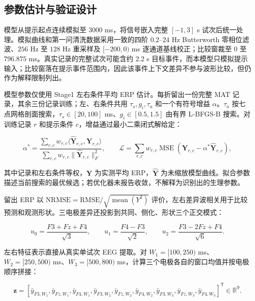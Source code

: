 \subsection{参数估计与验证设计}

模型从提示起点连续模拟至 3000 ms，将信号嵌入完整 \([-1,3]\) s 试次后统一处理。模拟曲线和第一问清洗数据采用一致的四阶 \(0.2\)--\(24\) Hz Butterworth 零相位滤波、\(256\) Hz 至 \(128\) Hz 重采样及 \([-200,0)\) ms 逐通道基线校正；比较窗裁至 \(0\) 至 \(796.875\) ms。真实记录的完整试次可能含约 2.2 s 目标事件，而本模型只模拟提示输入；比较窗落在提示事件范围内，因此该事件上下文差异不参与波形比较，但仍作为解释限制列出。

模型参数仅使用 Stage1 左右条件平均 ERP 估计。每折留出一份完整 MAT 记录，其余三份记录训练；左、右条件共用 \(\tau_s,g_i,\tau_a\) 和一个有符号增益 \(\alpha\)。\(\tau_a\) 按七点网格剖面搜索，\(\tau_s\in[20,100]\) ms、\(g_i\in[0.5,1.5]\) 由有界 L-BFGS-B 搜索。对训练记录 \(r\) 和提示条件 \(c\)，增益通过最小二乘闭式解给定：

\begin{equation}
\alpha^*=\frac{\sum_{r,c}w_{r,c}\langle\widehat{\mathbf Y}_{r,c},\mathbf Y_{r,c}\rangle}
{\sum_{r,c}w_{r,c}\lVert\widehat{\mathbf Y}_{r,c}\rVert_F^2},\qquad
\mathcal L=\sum_{r,c}w_{r,c}\operatorname{MSE}\!\left(\mathbf Y_{r,c}-\alpha^*\widehat{\mathbf Y}_{r,c}\right),
\end{equation}

其中记录和左右条件等权，\(\mathbf Y\) 为实测平均 ERP，\(\widehat{\mathbf Y}\) 为未缩放模型曲线。拟合参数描述当前搜索的最优候选；若优化器未报告收敛，不解释为识别出的生理参数。

留出 ERP 以 \(\mathrm{NRMSE}=\mathrm{RMSE}/\sqrt{\operatorname{mean}(Y^2)}\) 评价，左右差异波相关用于比较预测和观测形状。三电极差异还投影到共同、侧化、形状三个正交模式：

\begin{equation}
u_0=\frac{F3+Fz+F4}{\sqrt3},\qquad
u_1=\frac{F4-F3}{\sqrt2},\qquad
u_2=\frac{F3-2Fz+F4}{\sqrt6}.
\end{equation}

左右特征表示直接从真实单试次 EEG 提取。对 \(W_1=[100,250)\) ms、\(W_2=[250,500)\) ms、\(W_3=[500,800)\) ms，计算三个电极各自的窗口均值并按电极顺序拼接：

\begin{equation}
\mathbf z=\left[
\bar y_{F3,W_1},\bar y_{Fz,W_1},\bar y_{F4,W_1},
\bar y_{F3,W_2},\bar y_{Fz,W_2},\bar y_{F4,W_2},
\bar y_{F3,W_3},\bar y_{Fz,W_3},\bar y_{F4,W_3}
\right]^{\mathsf T}\in\mathbb R^9.
\end{equation}

